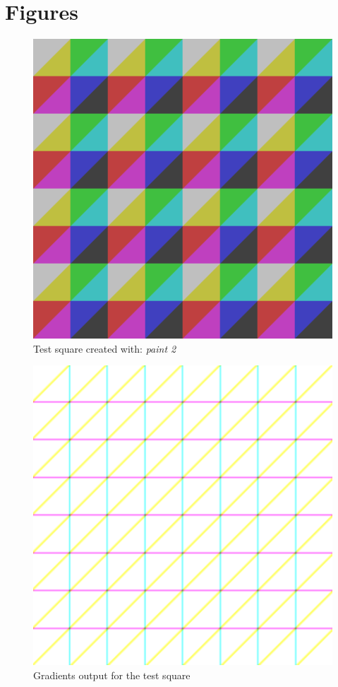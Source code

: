 \documentclass[11pt,twoside,english,a4paper]{article}
\begin{document}
\section{Figures}
\begin{figure}[ht!]
\centering
\includegraphics[width=0.618\columnwidth]{square}
\caption[]{Test square created with: \emph{paint 2}}
\label{square}
\end{figure}

\begin{figure}[ht!]
\centering
\includegraphics[width=0.618\columnwidth]{squareg}
\caption[]{Gradients output for the test square}
\label{squareg}
\end{figure}
\end{document}
